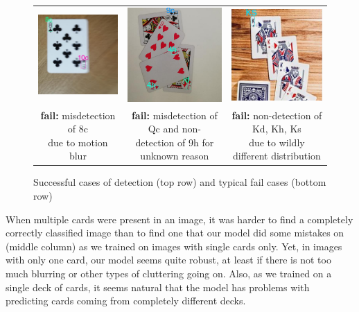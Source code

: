 \documentclass[a4paper]{article}
\begin{document}
\begin{figure}[h]
\begin{tabular}{ccc}
  \includegraphics[width=44mm]{fail1} &   \includegraphics[width=44mm]{fail2} &   \includegraphics[width=44mm]{fail3}\\
\makecell{\textbf{fail:}  misdetection of 8c \\ due to motion blur} & \makecell{\textbf{fail:} misdetection of Qc and non- \\detection of 9h for unknown reason} & \makecell{\textbf{fail:} non-detection of Kd, Kh, Ks \\ due to wildly different distribution} \\[6pt]



\end{tabular}
\caption{Successful cases of detection (top row) and typical fail cases (bottom row) }
\end{figure}
When multiple cards were present in an image, it was harder to find a completely correctly classified image than to find one that our model did some mistakes on (middle column) as we trained on images with single cards only. Yet, in images with only one card, our model seems quite robust, at least if there is not too much blurring or other types of cluttering going on. Also, as we trained on a single deck of cards, it seems natural that the model has problems with predicting cards coming from completely different decks.
\end{document}
